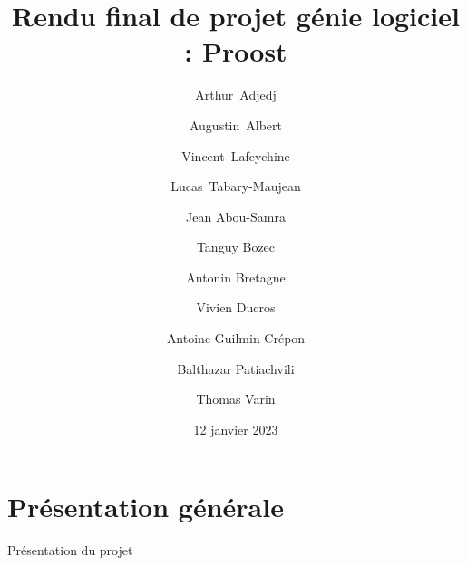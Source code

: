 \documentclass[12pt]{beamer}
\title[Rendu final : Proost]{Rendu final de projet génie logiciel : Proost}
\author{
    Arthur~Adjedj \and 
    Augustin~Albert \and
    Vincent~Lafeychine \and
    Lucas~Tabary-Maujean \and
    Jean Abou-Samra \and
    Tanguy Bozec \and
    Antonin Bretagne \and 
    Vivien Ducros \and
    Antoine Guilmin-Crépon \and
    Balthazar Patiachvili \and
    Thomas Varin
}
\date{12 janvier 2023}
\begin{document}
  \maketitle

  \section{Présentation générale}

  \begin{frame}{Présentation du projet}
    
    

  \end{frame}
\end{document}
